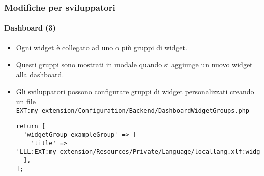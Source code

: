 \begin{frame}[fragile]
	\frametitle{Modifiche per sviluppatori}
	\framesubtitle{Dashboard (3)}

	\lstset{basicstyle=\tiny\ttfamily}

	\begin{itemize}
		\item Ogni widget è collegato ad uno o più gruppi di widget.
		\item Questi gruppi sono mostrati in modale quando si aggiunge un nuovo widget alla dashboard.
		\item Gli sviluppatori possono configurare gruppi di widget personalizzati creando un file\newline
			\smaller
				\texttt{EXT:my\_extension/Configuration/Backend/DashboardWidgetGroups.php}
			\normalsize

\vspace{-0.4cm}
\begin{lstlisting}
return [
  'widgetGroup-exampleGroup' => [
    'title' => 'LLL:EXT:my_extension/Resources/Private/Language/locallang.xlf:widget_group_name',
  ],
];
\end{lstlisting}

	\end{itemize}

\end{frame}


